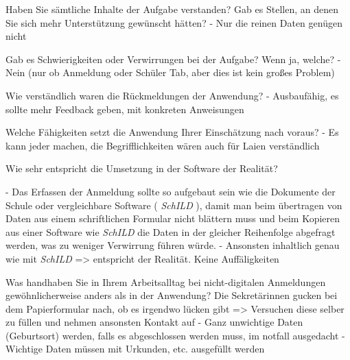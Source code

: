 Haben Sie sämtliche Inhalte der Aufgabe verstanden? Gab es Stellen, an denen Sie sich mehr Unterstützung gewünscht hätten?	
- Nur die reinen Daten genügen nicht 

Gab es Schwierigkeiten oder Verwirrungen bei der Aufgabe? Wenn ja, welche?
- Nein (nur ob Anmeldung oder Schüler Tab, aber dies ist kein großes Problem)	













Wie verständlich waren die Rückmeldungen der Anwendung?
- Ausbaufähig, es sollte mehr Feedback geben, mit konkreten Anweisungen	









Welche Fähigkeiten setzt die Anwendung Ihrer Einschätzung nach voraus?
- Es kann jeder machen, die Begrifflichkeiten wären auch für Laien verständlich	

Wie sehr entspricht die Umsetzung in der Software der Realität? 	

- Das Erfassen der Anmeldung sollte so aufgebaut sein wie die Dokumente der Schule oder vergleichbare Software ( \textit{SchILD} ), damit man beim übertragen von Daten aus einem schriftlichen Formular nicht blättern muss und beim Kopieren aus einer Software wie \textit{SchILD} die Daten in der gleicher Reihenfolge abgefragt werden, was zu weniger Verwirrung führen würde.
- Ansonsten inhaltlich genau wie mit \textit{SchILD} => entspricht der Realität. Keine Auffäligkeiten	





Was handhaben Sie in Ihrem Arbeitsalltag bei nicht-digitalen Anmeldungen gewöhnlicherweise anders als in der Anwendung?	
Die Sekretärinnen gucken bei dem Papierformular nach, ob es irgendwo lücken gibt => Versuchen diese selber zu füllen und nehmen ansonsten Kontakt auf
- Ganz unwichtige Daten (Geburtsort) werden, falls es abgeschlossen werden muss, im notfall ausgedacht
- Wichtige Daten müssen mit Urkunden, etc. ausgefüllt werden	















